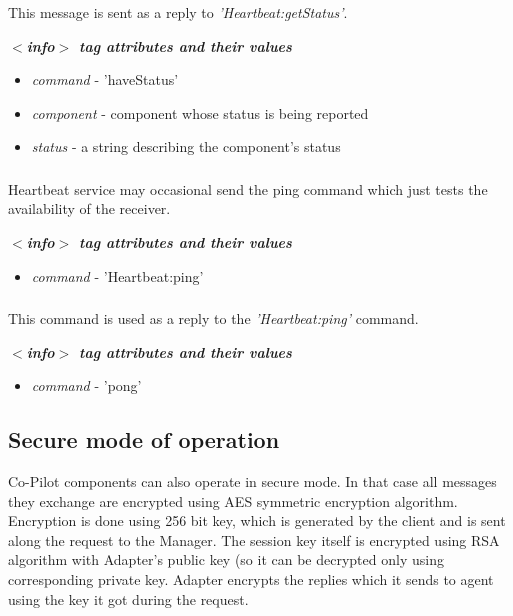 \subsubsection{}
\label{sct:heartbeathavestatus}
This message is sent as a reply to \emph{'Heartbeat:getStatus'}.

\emph{\bf $<$info$>$ tag attributes and their values}
\begin{itemize}
  \item \emph{command} - 'haveStatus'
  \item \emph{component} - component whose status is being reported
  \item \emph{status} - a string describing the component's status 
\end{itemize}


\subsubsection{}
\label{sct:heartbeatping}

Heartbeat service may occasional send the ping command which just tests the availability of the receiver.

\emph{\bf $<$info$>$ tag attributes and their values}
\begin{itemize}
  \item \emph{command} - 'Heartbeat:ping' 
\end{itemize}

\subsubsection{}
\label{sct:heartbeatpong}

This command is used as a reply to the \emph{'Heartbeat:ping'} command.

\emph{\bf $<$info$>$ tag attributes and their values}
\begin{itemize}
  \item \emph{command} - 'pong'
\end{itemize}


\subsection{Secure mode of operation}

Co-Pilot components can also operate in secure mode. In that case all messages they exchange are encrypted using AES symmetric encryption algorithm. Encryption is done using 256 bit key, which is generated by the client and is sent along the request to the Manager. The session key itself is encrypted using RSA algorithm with Adapter's public key (so it can be decrypted only using corresponding private key. Adapter encrypts the replies which it sends to agent using the key it got during the request.

